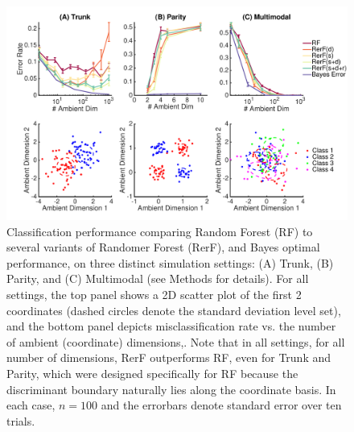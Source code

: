 \documentclass{article} %
\begin{document}
\begin{figure}[h]
\begin{center}
\includegraphics[trim=0in 0.4in 0in 0.4in, clip=true, width=\linewidth]{../Figures/pdf/Fig1_Lhat}
\end{center}
\caption{Classification performance comparing Random Forest (RF) to several variants of Randomer Forest (RerF), and Bayes optimal performance, on three distinct simulation settings: (A) Trunk, (B) Parity, and (C) Multimodal (see Methods for details).  For all settings, the top panel
shows a 2D scatter plot of the first 2 coordinates (dashed circles denote the standard deviation level set),
and the bottom panel depicts misclassification rate vs. the number of ambient (coordinate) dimensions,.  Note that in all settings, for all number of dimensions, RerF outperforms RF, even for Trunk and Parity, which were designed specifically for RF because the discriminant boundary naturally lies along the coordinate basis. In each case, $n=100$ and the errorbars denote standard error over ten trials.}
\label{fig:sim}
\end{figure}

\end{document}
